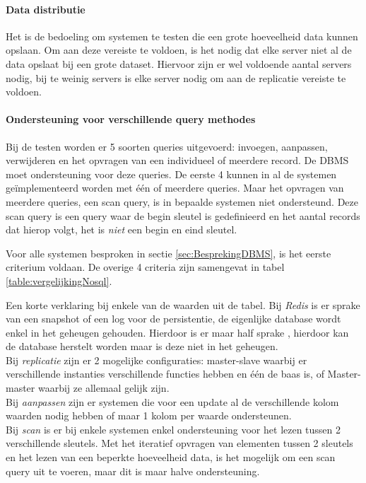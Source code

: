 \paragraph{Data distributie} Het is de bedoeling om systemen te testen die een grote hoeveelheid data kunnen opslaan. Om aan deze vereiste te voldoen, is het nodig dat elke server niet al de data opslaat bij een grote dataset. Hiervoor zijn er wel voldoende aantal servers nodig, bij te weinig servers is elke server nodig om aan de replicatie vereiste te voldoen. 

\paragraph{Ondersteuning voor verschillende query methodes} Bij de testen worden er 5 soorten queries uitgevoerd: invoegen, aanpassen, verwijderen en het opvragen van een individueel of meerdere record. De DBMS moet ondersteuning voor deze queries. De eerste 4 kunnen in al de systemen geïmplementeerd worden met één of meerdere queries. Maar het opvragen van meerdere queries, een scan query, is in bepaalde systemen niet ondersteund. Deze scan query is een query waar de begin sleutel is gedefinieerd en het aantal records dat hierop volgt, het is \textit{niet} een begin en eind sleutel. 

Voor alle systemen besproken in sectie \ref{sec:BesprekingDBMS}, is het eerste criterium voldaan. De overige 4 criteria zijn samengevat in tabel \ref{table:vergelijkingNosql}. 

Een korte verklaring bij enkele van de waarden uit de tabel. Bij \textit{Redis} is er sprake van een snapshot of een log voor de persistentie, de eigenlijke database wordt enkel in het geheugen gehouden. Hierdoor is er maar half sprake , hierdoor kan de database herstelt worden maar is deze niet in het geheugen. \\
Bij \textit{replicatie} zijn er 2 mogelijke configuraties: master-slave waarbij er verschillende instanties verschillende functies hebben en één de baas is, of Master-master waarbij ze allemaal gelijk zijn. \\
Bij \textit{aanpassen} zijn er systemen die voor een update al de verschillende kolom waarden nodig hebben of maar 1 kolom per waarde ondersteunen. \\
Bij \textit{scan} is er bij enkele systemen enkel ondersteuning voor het lezen tussen 2 verschillende sleutels. Met het iteratief opvragen van elementen tussen 2 sleutels en het lezen van een beperkte hoeveelheid data, is het mogelijk om een scan query uit te voeren, maar dit is maar halve ondersteuning. 


